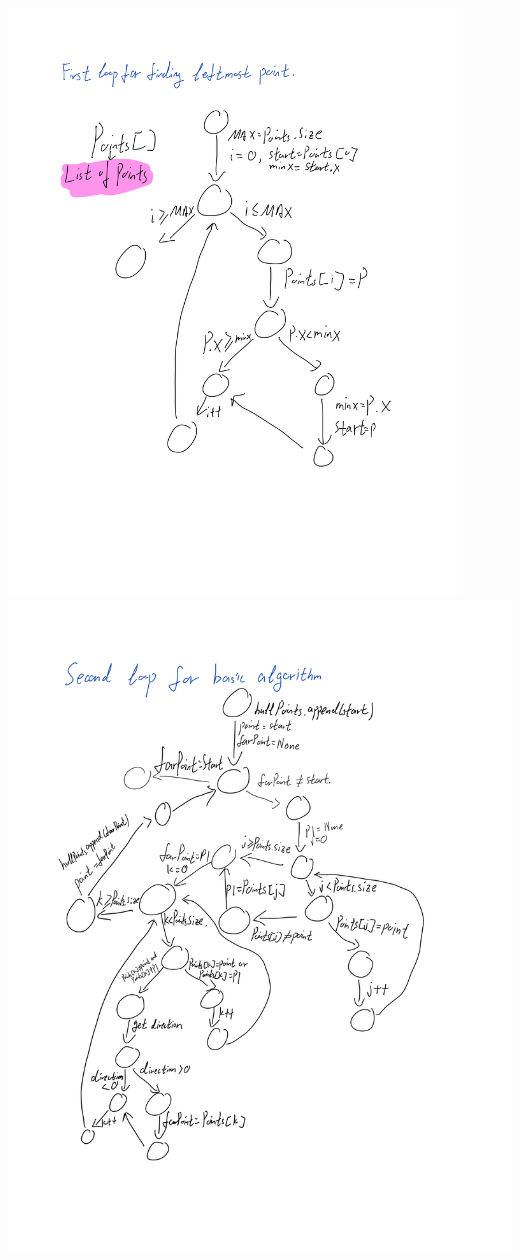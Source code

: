 \documentclass[12pt]{article}
\begin{document}
\begin{center}
  \includegraphics[width=0.9\textwidth]{Page1.png} \\
  \includegraphics[width=1.2\textwidth]{Page2.png} \\
\end{center}
\end{document}
